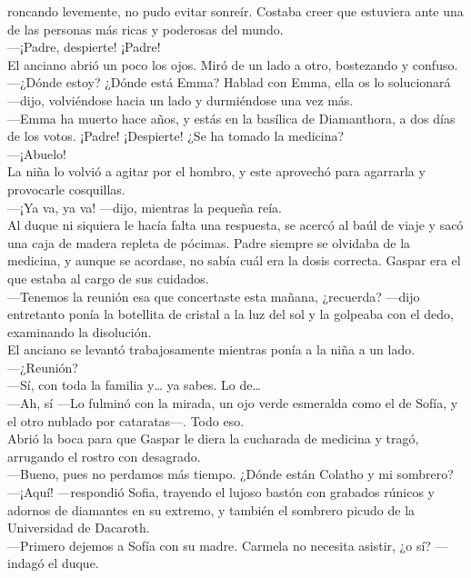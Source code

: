 \documentclass[
  letterpaper,
]{krantz}
\begin{document}
roncando levemente, no pudo evitar sonreír. Costaba creer que estuviera
ante una de las personas más ricas y poderosas del mundo.\\
---¡Padre, despierte! ¡Padre!\\
El anciano abrió un poco los ojos. Miró de un lado a otro, bostezando y
confuso.\\
---¿Dónde estoy? ¿Dónde está Emma? Hablad con Emma, ella os lo
solucionará ---dijo, volviéndose hacia un lado y durmiéndose una vez
más.\\
---Emma ha muerto hace años, y estás en la basílica de Diamanthora, a
dos días de los votos. ¡Padre! ¡Despierte! ¿Se ha tomado la medicina?\\
---¡Abuelo!\\
La niña lo volvió a agitar por el hombro, y este aprovechó para
agarrarla y provocarle cosquillas.\\
---¡Ya va, ya va! ---dijo, mientras la pequeña reía.\\
Al duque ni siquiera le hacía falta una respuesta, se acercó al baúl de
viaje y sacó una caja de madera repleta de pócimas. Padre siempre se
olvidaba de la medicina, y aunque se acordase, no sabía cuál era la
dosis correcta. Gaspar era el que estaba al cargo de sus cuidados.\\
---Tenemos la reunión esa que concertaste esta mañana, ¿recuerda?
---dijo entretanto ponía la botellita de cristal a la luz del sol y la
golpeaba con el dedo, examinando la disolución.\\
El anciano se levantó trabajosamente mientras ponía a la niña a un
lado.\\
---¿Reunión?\\
---Sí, con toda la familia y\ldots{} ya sabes. Lo de\ldots{}\\
---Ah, sí ---Lo fulminó con la mirada, un ojo verde esmeralda como el de
Sofía, y el otro nublado por cataratas---. Todo eso.\\
Abrió la boca para que Gaspar le diera la cucharada de medicina y tragó,
arrugando el rostro con desagrado.\\
---Bueno, pues no perdamos más tiempo. ¿Dónde están Colatho y mi
sombrero?\\
---¡Aquí! ---respondió Sofia, trayendo el lujoso bastón con grabados
rúnicos y adornos de diamantes en su extremo, y también el sombrero
picudo de la Universidad de Dacaroth.\\
---Primero dejemos a Sofía con su madre. Carmela no necesita asistir, ¿o
sí? --- indagó el duque.\\
\end{document}

